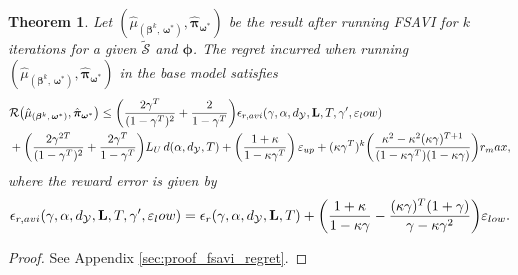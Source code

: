 \documentclass[11pt, notitlepage]{article}
\newcommand{\1}{\mathbbm{1}}
\newtheorem{theorem}{Theorem}[section]
\begin{document}
\begin{theorem} \label{thm:fsavi_regret}
    Let $(\hat{\mu}_{(\boldsymbol{\beta}^k,\, \boldsymbol{\omega}^*)}, \hat{\boldsymbol{\pi}}_{\boldsymbol{\omega}^*})$ be the result after running FSAVI for $k$ iterations for a given $\tilde{\mathcal{S}}$ and $\boldsymbol{\phi}$. The regret incurred when running $(\hat{\mu}_{(\boldsymbol{\beta}^k,\, \boldsymbol{\omega}^*)}, \hat{\boldsymbol{\pi}}_{\boldsymbol{\omega}^*})$ in the base model satisfies
    \begin{align*}
        &\mathcal R\bigl(\hat{\mu}_{(\boldsymbol{\beta}^k,\, \boldsymbol{\omega}^*)}, \hat{\boldsymbol{\pi}}_{\boldsymbol{\omega}^*}\bigr) \leq \biggl(\frac{2\gamma^T}{(1-\gamma^T)^2} + \frac{2}{1-\gamma^T}\biggr) \epsilon_{r, \textnormal{avi}}(\gamma,\alpha,d_\mathcal{Y},\mathbf{L},T, \gamma', \varepsilon_\textnormal{low})\\
&+ \biggl(\frac{2\gamma^{2T}}{(1-\gamma^T)^2} + \frac{2\gamma^T}{1-\gamma^T}\biggr) L_U \, d(\alpha,d_\mathcal{Y},T)+ \biggl(\frac{1 + \kappa}{1- \kappa \gamma^T} \biggr)\,\varepsilon_{\textnormal{up}} + (\kappa \gamma^T)^k \biggl( \frac{\kappa^2 - \kappa^2 (\kappa\gamma)^{T+1}}{(1-\kappa \gamma^T) (1-\kappa\gamma)} \biggr) r_\textnormal{max},
    \end{align*}
    where the reward error is given by
    \begin{align*}
\epsilon_{r, \textnormal{avi}}(\gamma,\alpha,d_\mathcal{Y},\mathbf{L},T, \gamma', \varepsilon_\textnormal{low}) = \epsilon_r(\gamma,\alpha,d_\mathcal{Y},\mathbf{L},T) + \biggl(\frac{1+\kappa}{1-\kappa\gamma} - \frac{(\kappa\gamma)^T(1+\gamma)}{\gamma-\kappa\gamma^2}\biggr) \varepsilon_{\textnormal{low}}.
\end{align*}
\end{theorem}
\begin{proof}
See Appendix \ref{sec:proof_fsavi_regret}.
\end{proof}




















    
\end{document}
